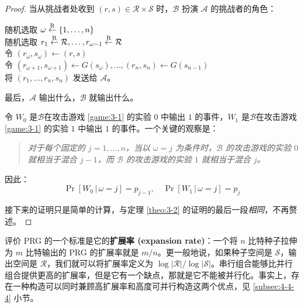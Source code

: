 \begin{proof}
\vspace*{10pt}

\hspace*{5pt} 当从挑战者处收到 $(r,s)\in\mathcal{R}\times\mathcal{S}$ 时，$\mathcal B$ 扮演 $\mathcal A$ 的挑战者的角色：

\vspace*{5pt}

\hspace*{28.5pt} 随机选取 $\omega\overset{\rm R}\leftarrow\{1,\dots,n\}$\\
\hspace*{50pt} 随机选取 $r_1\overset{\rm R}\leftarrow\mathcal R,\dots,r_{\omega-1}\overset{\rm R}\leftarrow\mathcal R$\\
\hspace*{50pt} 令 $(r_{\omega},s_{\omega})\leftarrow(r,s)$\\
\hspace*{50pt} 令 $(r_{\omega+1},s_{\omega+1})\leftarrow G(s_{\omega}),\dots,(r_n,s_n)\leftarrow G(s_{n-1})$\\
\hspace*{50pt} 将 $(r_1,\dots,r_n,s_n)$ 发送给 $\mathcal A$。

\vspace*{5pt}

\hspace*{5pt} 最后，$\mathcal A$ 输出什么，$\mathcal B$ 就输出什么。

\vspace*{10pt}

令 $W_0$ 是$\mathcal B$在攻击游戏 \ref{game:3-1} 的实验 $0$ 中输出 $1$ 的事件，$W_1$ 是$\mathcal B$在攻击游戏 \ref{game:3-1} 的实验 $1$ 中输出 $1$ 的事件。一个关键的观察是：
\begin{quote}
\emph{对于每个固定的 $j=1,\dots,n$，当以 $\omega=j$ 为条件时，$\mathcal B$ 的攻击游戏的实验 $0$ 就相当于混合 $j-1$，而 $\mathcal B$ 的攻击游戏的实验 $1$ 就相当于混合 $j$。
}
\end{quote}
因此：
\[
\Pr[W_0\,|\,\omega=j]=p_{j-1},
\quad
\Pr[W_1\,|\,\omega=j]=p_{j}
\]

接下来的证明只是简单的计算，与定理 \ref{theo:3-2} 的证明的最后一段\emph{相同}，不再赘述。
\end{proof}

评价 PRG 的一个标准是它的\textbf{扩展率 (expansion rate)}：一个将 $n$ 比特种子拉伸为 $m$ 比特输出的 PRG 的扩展率就是 $m/n$。更一般地说，如果种子空间是 $\mathcal{S}$，输出空间是 $\mathcal{R}$，我们就可以将扩展率定义为 $\log|\mathcal{R}|/\log|\mathcal{S}|$。串行组合能够比并行组合提供更高的扩展率，但是它有一个缺点，那就是它不能被并行化。事实上，存在一种构造可以同时兼顾高扩展率和高度可并行构造这两个优点，见 \ref{subsec:4-4-4} 小节。

